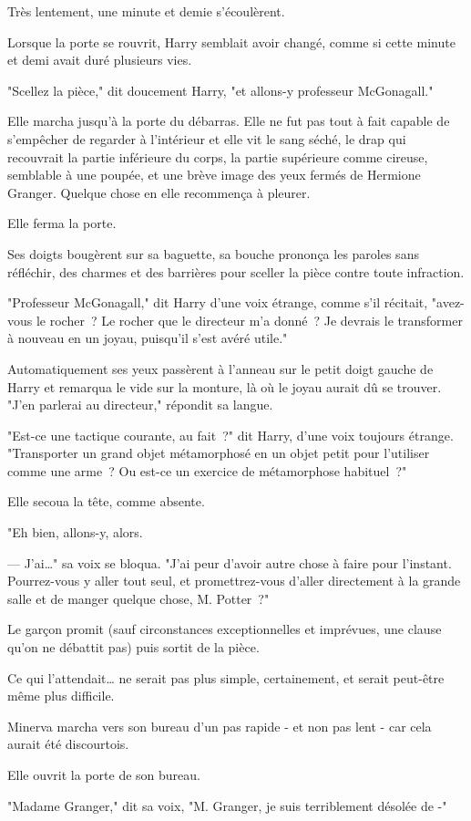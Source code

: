 Très lentement, une minute et demie s'écoulèrent.

\later

Lorsque la porte se rouvrit, Harry semblait avoir changé, comme si cette minute et demi avait duré plusieurs vies.

"Scellez la pièce," dit doucement Harry, "et allons-y professeur McGonagall."

Elle marcha jusqu'à la porte du débarras. Elle ne fut pas tout à fait capable de s'empêcher de regarder à l'intérieur et elle vit le sang séché, le drap qui recouvrait la partie inférieure du corps, la partie supérieure comme cireuse, semblable à une poupée, et une brève image des yeux fermés de Hermione Granger. Quelque chose en elle recommença à pleurer.

Elle ferma la porte.

Ses doigts bougèrent sur sa baguette, sa bouche prononça les paroles sans réfléchir, des charmes et des barrières pour sceller la pièce contre toute infraction.

"Professeur McGonagall," dit Harry d'une voix étrange, comme s'il récitait, "avez-vous le rocher~? Le rocher que le directeur m'a donné~? Je devrais le transformer à nouveau en un joyau, puisqu'il s'est avéré utile."

Automatiquement ses yeux passèrent à l'anneau sur le petit doigt gauche de Harry et remarqua le vide sur la monture, là où le joyau aurait dû se trouver. "J'en parlerai au directeur," répondit sa langue.

"Est-ce une tactique courante, au fait~?" dit Harry, d'une voix toujours étrange. "Transporter un grand objet métamorphosé en un objet petit pour l'utiliser comme une arme~? Ou est-ce un exercice de métamorphose habituel~?"

Elle secoua la tête, comme absente.

"Eh bien, allons-y, alors.

--- J'ai…" sa voix se bloqua. "J'ai peur d'avoir autre chose à faire pour l'instant. Pourrez-vous y aller tout seul, et promettrez-vous d'aller directement à la grande salle et de manger quelque chose, M. Potter~?"

Le garçon promit (sauf circonstances exceptionnelles et imprévues, une clause qu'on ne débattit pas) puis sortit de la pièce.

Ce qui l'attendait… ne serait pas plus simple, certainement, et serait peut-être même plus difficile.

\later

Minerva marcha vers son bureau d'un pas rapide - et non pas lent - car cela aurait été discourtois.

Elle ouvrit la porte de son bureau.

"Madame Granger," dit sa voix, "M. Granger, je suis terriblement désolée de -" 
